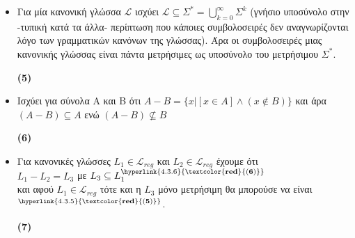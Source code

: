 \begin{tcolorbox}[colback=yellow!15!white, colframe=blue!50!white,
	fonttitle=\bfseries\Large, title = Απόδειξη - μέρος 2/2]
	\begin{itemize}
		\itemsep1em


	\item Για μία κανονική γλώσσα $\mathcal{L}$ ισχύει $\mathcal{L} \subseteq \Sigma^* = \bigcup\limits_{k =
		0}^{\infty}\Sigma^k$ (γνήσιο υποσύνολο στην -τυπική κατά τα άλλα- περίπτωση που κάποιες συμβολοσειρές δεν
	αναγνωρίζονται λόγο των γραμματικών κανόνων της γλώσσας). Άρα οι συμβολοσειρές μιας κανονικής γλώσσας είναι
	πάντα μετρήσιμες ως υποσύνολο του μετρήσιμου $\Sigma^*$.
	\reducevspace\reducevspace\reducevspace\reducevspace\reducevspace\reducevspace\reducevspace
	\reducevspace\reducevspace\reducevspace\reducevspace\reducevspace\reducevspace\reducevspace
	\begin{flushright}\hypertarget{4.3.5}{\bf{(5)}}\end{flushright}

	\item Ισχύει για σύνολα Α και Β ότι $Α - Β = \{x \vert [x \in A] \land (x \notin B)\}$ και άρα $(A - B)
	\subseteq A$ ενώ $(A - B) \not\subseteq B$
	\reducevspace\reducevspace\reducevspace\reducevspace\reducevspace\reducevspace\reducevspace
	\reducevspace\reducevspace\reducevspace\reducevspace\reducevspace\reducevspace\reducevspace
	\begin{flushright}\hypertarget{4.3.6}{\bf{(6)}}\end{flushright}

	\item Για κανονικές γλώσσες $L_1 \in \mathcal{L}_{reg}$ και $L_2 \in \mathcal{L}_{reg}$
	έχουμε ότι\\
	$L_1 - L_2 =  L_3$ με $L_3 \subseteq L_1^{\hyperlink{4.3.6}{\bf{\textcolor{red}{(6)}}}}$ \\
	και αφού $L_1 \in \mathcal{L}_{reg}$ τότε και η $L_3$ μόνο μετρήσιμη θα μπορούσε να
	είναι$^{\hyperlink{4.3.5}{\bf{\textcolor{red}{(5)}}}}$.
	\reducevspace\reducevspace\reducevspace\reducevspace\reducevspace\reducevspace\reducevspace
	\reducevspace\reducevspace\reducevspace\reducevspace\reducevspace\reducevspace\reducevspace
	\begin{flushright}\hypertarget{4.3.7}{\bf{(7)}}\end{flushright}


\end{itemize}
\end{tcolorbox}
